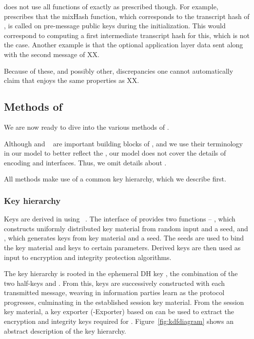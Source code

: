 \mEdhoc{} does not use all functions of \mNoise{} exactly as prescribed though.
%
For example, \mNoise{} prescribes that the mixHash function, which corresponds
to the transcript hash of \mEdhoc{}, is called on pre-message public keys
during the initialization.
%
This would correspond to \mEdhoc{} computing a first intermediate transcript
hash for this, which is not the case.
%
Another example is that the optional application layer data sent along with
the second message of XX.

Because of these, and possibly other, discrepancies one cannot automatically
claim that \mEdhoc{} enjoys the same properties as XX.
%

\spacehack
\subsection{Methods of \mEdhoc{}}
\label{sec:methods}
\fillhack
We are now ready to dive into the various methods of \mEdhoc.

Although \mCbor{} and \mCose{}~\cite{rfc8152} are important building blocks of
\mEdhoc{}, and we use their terminology in our model to better reflect the
\mSpec{}, our model does not cover the details of encoding and \mCose{}
interfaces.
%
Thus, we omit details about \mCose{}.
%

All methods make use of a common key hierarchy, which we describe first.
%

\spacehack
\subsubsection{Key hierarchy}
\label{sec:keyHierarchy}

Keys are derived in \mEdhoc{} using \mHkdf{}~\cite{rfc5869}.
%
The interface of \mHkdf{} provides two functions -- \mHkdfExtract{}, which
constructs uniformly distributed key material from random input and a seed,
and \mHkdfExpand{}, which generates keys from key material and a seed.
%
The seeds are used to bind the key material and keys to certain parameters.
%
Derived keys are then used as input to encryption and integrity protection
algorithms.
%

The key hierarchy is rooted in the ephemeral DH key \mGxy{}, the combination
of the two half-keys \mGx{} and \mGy{}.
%
From this, keys are successively constructed with each transmitted message,
weaving in information parties learn as the protocol progresses, culminating
in the established session key material.
%
From the session key material, a key exporter (\mEdhoc-Exporter) based on
\mHkdf{} can be used to extract the encryption and integrity keys required
for \mOscore{}.
%
Figure~\ref{fig:kdfdiagram} shows an abstract description of the key hierarchy.
%

